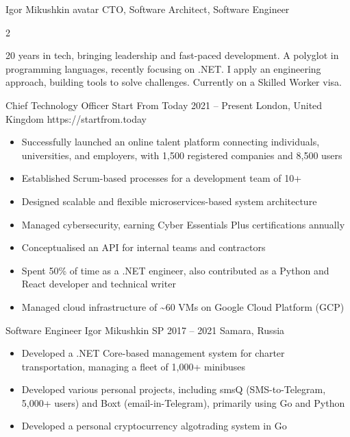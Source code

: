 \documentclass[9pt,a4paper]{igrmkcv}
\begin{document}
\makeCvHeader
    {Igor Mikushkin}
    {avatar}
    {CTO, Software Architect, Software Engineer}

\begin{paracol}{2}

20 years in tech, bringing leadership and fast-paced development.
A polyglot in programming languages, recently focusing on .NET.
I apply an engineering approach, building tools to solve challenges.
Currently on a Skilled Worker visa.

    \cvLeftEvent
        {Chief Technology Officer}
        {Start From Today}
        {2021 -- Present}
        {London, United Kingdom}
        {https://startfrom.today}

        \begin{itemize}
            \item Successfully launched an online talent platform connecting individuals,
                  universities, and employers, with 1,500 registered companies and 8,500 users
            \item Established Scrum-based processes for a development team of 10+
            \item Designed scalable and flexible microservices-based system architecture
            \item Managed cybersecurity, earning Cyber Essentials Plus certifications annually
            \item Conceptualised an API for internal teams and contractors
            \item Spent 50\% of time as a .NET engineer,
                  also contributed as a Python and React developer and technical writer
            \item Managed cloud infrastructure of
                  \textasciitilde 60 VMs on Google Cloud Platform (GCP)
        \end{itemize}

    \cvLeftEvent
        {Software Engineer}
        {Igor Mikushkin SP}
        {2017 -- 2021}
        {Samara, Russia}
        {}

        \begin{itemize}
            \item Developed a .NET Core-based management system for charter transportation,
                  managing a fleet of 1,000+ minibuses
            \item Developed various personal projects,
                  including smsQ (SMS-to-Telegram, 5,000+ users)
                  and Boxt (email-in-Telegram), primarily using Go and Python
            \item Developed a personal cryptocurrency algotrading system in Go
        \end{itemize}


\end{paracol}
\end{document}
